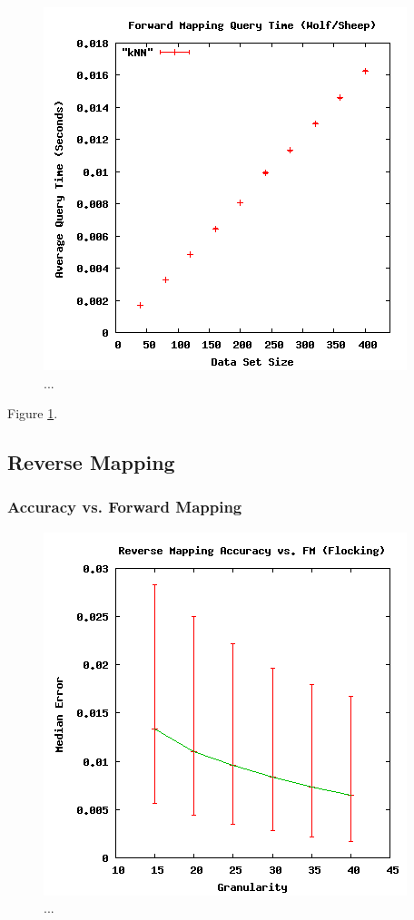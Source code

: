 \begin{figure}[ht]
\centering
\includegraphics[scale=.5]{images/results_wolfsheep/fm-query.png}
\caption{...}
\label{fig:wolfsheepfmquery}
\end{figure}

Figure \ref{fig:wolfsheepfmquery}.



 \subsection{Reverse Mapping}

  \subsubsection{Accuracy vs. Forward Mapping}

\begin{figure}[ht]
\centering
\includegraphics[scale=.5]{images/results_flocking/rmacc.png}
\caption{...}
\label{fig:flockrmacc}
\end{figure}

